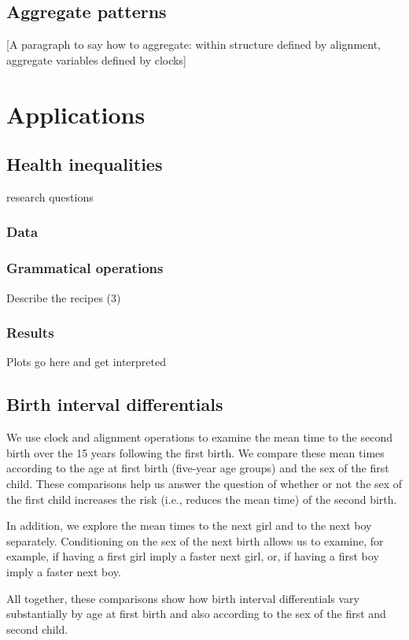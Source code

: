 \documentclass{article}
\begin{document}
\subsection{Aggregate patterns}

[A paragraph to say how to aggregate: within structure defined by alignment, aggregate variables defined by clocks]


\section{Applications}

\subsection{Health inequalities}
research questions
\subsubsection{Data}

\subsubsection{Grammatical operations}
Describe the recipes (3)

\subsubsection{Results}
Plots go here and get interpreted

\subsection{Birth interval differentials}

 We use clock and alignment operations to examine the mean time to the second birth over the 15 years following the first birth. We compare these mean times according to the age at first birth (five-year age groups) and the sex of the first child. These comparisons help us answer the question of whether or not the sex of the first child increases the risk (i.e., reduces the mean time) of the second birth. 
 
 In addition, we explore the mean times to the next girl and to the next boy separately. Conditioning on the sex of the next birth allows us to examine, for example, if having a first girl imply a faster next girl, or, if having a first boy imply a faster next boy. 
 
 All together, these comparisons show how birth interval differentials vary substantially by age at first birth and also according to the sex of the first and second child.
 
\end{document}
